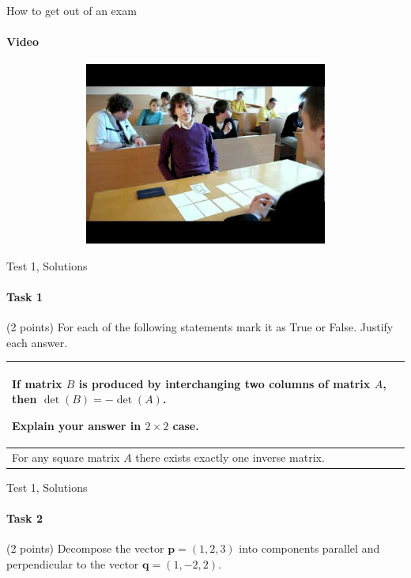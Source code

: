 \documentclass[aspectratio=169,notes]{beamer}
\begin{document}
\begin{frame}[t]{How to get out of an exam}
    \framesubtitle{Video}
    \vspace{-0.6cm}
    \begin{figure}[H]
        \href{https://youtu.be/eiLF4zRA634}{
            \centering\includegraphics[height=6cm,width=1\textwidth,keepaspectratio]{meme.jpg}}
        \label{fig:meme.jpg}
    \end{figure}
\end{frame}

\begin{frame}[t]{Test 1, Solutions}
\framesubtitle{Task 1}
(2 points) For each of the following statements mark it as True or False. Justify each answer.
\smallskip


\begin{enumerate}

\begin{tabular}[b]{p{10cm}|p{2cm}}

\hline
   \item  If matrix $B$ is produced by interchanging two columns of matrix $A$, then $\det (B) = -\det (A) $. 
   
   Explain your answer in $2\times 2$ case. &    \\ 
    \hline
    \item For any square matrix $A$ there exists exactly one inverse matrix. & \\
    \hline
    \end{tabular}
\end{enumerate}
\end{frame}

\begin{frame}[t]{Test 1, Solutions}
\framesubtitle{Task 2}
(2 points) Decompose the vector $\textbf{p} = (1, 2, 3)$ into components parallel and perpendicular to the vector $\textbf{q} = (1, -2, 2)$.
\end{frame}
\end{document}
